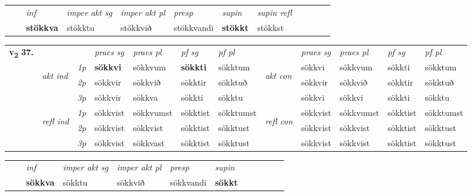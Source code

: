 \begin{tabular}{llllllllllll}
 & & \textit{inf} & \textit{imper akt sg} & \textit{imper akt pl}   & \textit{presp} & \textit{supin} & \textit{supin refl}      \\*
  & & \textbf{stökkva} & stökktu  & stökkvið   & stökkvandi &  \textbf{stökkt} & stökkst  \\*
\cmidrule{1-12}
\end{tabular}



\begin{tabular}{llllllllllll} \toprule
\multirow{4}{*}{{{\textbf{v{\textsubscript{2}}} \Large{\textbf{37.}}}}}  & &   &  \textit{praes sg}  & \textit{praes pl}  &\textit{ pf sg} & \textit{pf pl} &  &  \textit{praes sg}  & \textit{praes pl}  & \textit{pf sg} & \textit{pf pl } \\*
	\cmidrule{4-7} \cmidrule{9-12}
 & \multirow{3}{*}{\begin{turn}{90}\textit{akt ind}\end{turn}} & {\textit{1p}} & \textbf{sökkvi} & sökkvum    & \textbf{sökkti} & sökktum & \multirow{3}{*}{\begin{turn}{90}\textit{akt con}\end{turn}} &sökkvi & sökkvum & sökkti & sökktum\\*
& &  {\textit{2p}} &  sökkvir  & sökkvið   & sökktir & sökktuð & & sökkvir & sökkvið & sökktir & sökktuð \\*
& &  {\textit{3p}} & sökkvir & sökkva   & sökkti & sökktu & & sökkvi & sökkvi& sökkti & sökktu  \\*
\cmidrule{4-7} \cmidrule{9-12}
 &\multirow{3}{*}{\begin{turn}{90}\textit{refl ind}\end{turn}} & {\textit{1p}} & sökkvist & sökkvumst    & sökktist & sökktumst & \multirow{3}{*}{\begin{turn}{90}\textit{refl con}\end{turn}}  &sökkvist & sökkvumst & sökktist & sökktumst\\*
 &&  {\textit{2p}} &  sökkvist  & sökkvist   & sökktist & sökktust & &sökkvist & sökkvist & sökktist & sökktust \\*
& &  {\textit{3p}} & sökkvist & sökkvast   & sökktist & sökktust & & sökkvist & sökkvist& sökktist & sökktust  \\*
\cmidrule{4-7} \cmidrule{9-12}
\end{tabular}


\begin{tabular}{llllllllllll}
 & & \textit{inf} & \textit{imper akt sg} & \textit{imper akt pl}   & \textit{presp} & \textit{supin}       \\*
  & & \textbf{sökkva} & sökktu  & sökkvið   & sökkvandi &  \textbf{sökkt}   \\*
\cmidrule{1-12}
\end{tabular}



